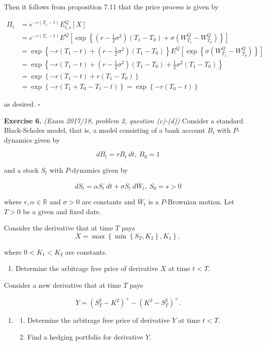 \documentclass[
]{book}
\providecommand{\tightlist}{%
  \setlength{\itemsep}{0pt}\setlength{\parskip}{0pt}}
\begin{document}
Then it follows from proposition 7.11 that the price process is given by

\begin{align*}
\Pi_t&=e^{-r(T_1-t)}E^Q_{t,s}[X]\\
&=e^{-r(T_1-t)}E^Q\left[\exp\left\{\left(r-\frac{1}{2}\sigma^2\right)(T_1-T_0) +\sigma\left(W_{T_1}^Q-W_{T_0}^Q\right)\right\}\right]\\
&=\exp\left\{-r(T_1-t)+\left(r-\frac{1}{2}\sigma^2\right)(T_1-T_0)\right\}E^Q\left[\exp\left\{\sigma\left(W_{T_1}^Q-W_{T_0}^Q\right)\right\}\right]\\
&=\exp\left\{-r(T_1-t)+\left(r-\frac{1}{2}\sigma^2\right)(T_1-T_0)+\frac{1}{2}\sigma^2(T_1-T_0)\right\}\\
&=\exp\left\{-r(T_1-t)+r(T_1-T_0)\right\}\\
&=\exp\left\{-r(T_1+T_0-T_1-t)\right\}=\exp\left\{-r(T_0-t)\right\}
\end{align*}

as desired. \(\square\)

\textbf{Exercise 6.} \emph{(Exam 2017/18, problem 2, question (c)-(d))} Consider a standard Black-Scholes model, that is, a model consisting of a bank account \(B_t\) with \(P\)-dynamics given by

\[
dB_t=rB_t\ dt,\ B_0=1
\]

and a stock \(S_t\) with \(P\)-dynamics given by

\[
dS_t=\alpha S_t\ dt+\sigma S_t\ d\overline{W}_t,\ S_0=s>0
\]

where \(r,\alpha\in\mathbb{R}\) and \(\sigma >0\) are constants and \(\overline{W}_t\) is a \(P\)-Brownian motion. Let \(T>0\) be a given and fixed date.

Consider the derivative that at time \(T\) pays
\[
X=\max\left\{\min\left\{S_T,K_2\right\},K_1\right\},
\]

where \(0<K_1<K_2\) are constants.

\begin{enumerate}
\def\labelenumi{\alph{enumi}.}
\tightlist
\item
  Determine the arbitrage free price of derivative \(X\) at time \(t<T\).
\end{enumerate}

Consider a new derivative that at time \(T\) pays

\[
Y=(S^2_T-K^2)^+-(K^2-S^2_T)^+.
\]

\begin{enumerate}
\def\labelenumi{\alph{enumi}.}
\setcounter{enumi}{1}
\item
  \begin{enumerate}
  \def\labelenumii{\roman{enumii}.}
  \tightlist
  \item
    Determine the arbitrage free price of derivative \(Y\) at time \(t<T\).
  \item
    Find a hedging portfolio for derivative \(Y\).
  \end{enumerate}
\end{enumerate}
\end{document}
